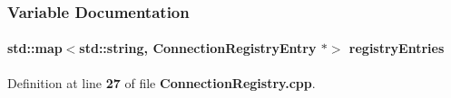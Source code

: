 \subsubsection{Variable Documentation}
\paragraph[{registry\+Entries}]{\setlength{\rightskip}{0pt plus 5cm}std\+::map$<${\bf std\+::string}, {\bf Connection\+Registry\+Entry} $\ast$$>$ registry\+Entries\hspace{0.3cm}{\ttfamily [static]}}\label{ConnectionRegistry_8cpp_accf879af4b411f466176c3fe04dd7494}


Definition at line {\bf 27} of file {\bf Connection\+Registry.\+cpp}.

